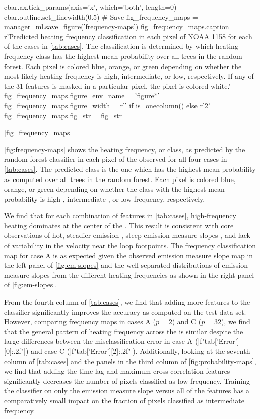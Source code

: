 \begin{pycode}[manager_ml]
cbar.ax.tick_params(axis='x', which='both', length=0)
cbar.outline.set_linewidth(0.5)
# Save
fig_frequency_maps = manager_ml.save_figure('frequency-maps')
fig_frequency_maps.caption = r'Predicted heating frequency classification in each pixel of NOAA 1158 for each of the cases in \autoref{tab:cases}. The classification is determined by which heating frequency class has the highest mean probability over all trees in the random forest. Each pixel is colored blue, orange, or green depending on whether the most likely heating frequency is high, intermediate, or low, respectively. If any of the 31 features is masked in a particular pixel, the pixel is colored white.'
fig_frequency_maps.figure_env_name = 'figure*'
fig_frequency_maps.figure_width = r'\columnwidth' if is_onecolumn() else r'2\columnwidth'
fig_frequency_maps.fig_str = fig_str
\end{pycode}
\py[manager_ml]|fig_frequency_maps|

\autoref{fig:frequency-maps} shows the heating frequency, or class, as predicted by the random forest classifier in each pixel of the observed \AR{} for all four cases in \autoref{tab:cases}.
The predicted class is the one which has the highest mean probability as computed over all trees in the random forest.
Each pixel is colored blue, orange, or green depending on whether the class with the highest mean probability is high-, intermediate-, or low-frequency, respectively.

We find that for each combination of features in \autoref{tab:cases}, high-frequency heating dominates at the center of the \AR{}.
This result is consistent with \AR{} core observations of hot, steadier emission \citep{warren_evidence_2010,warren_constraints_2011}, steep emission measure slopes \citep[e.g.][]{winebarger_using_2011,del_zanna_evolution_2015}, and lack of variability in the velocity \citep{brooks_flows_2009} near the loop footpoints.
The frequency classification map for case A is as expected given the observed emission measure slope map in the left panel of \autoref{fig:em-slopes} and the well-separated distributions of emission measure slopes from the different heating frequencies as shown in the right panel of \autoref{fig:em-slopes}.

From the fourth column of \autoref{tab:cases}, we find that adding more features to the classifier significantly improves the accuracy as computed on the test data set.
However, comparing frequency maps in cases A ($p=2$) and C ($p=32$), we find that the general pattern of heating frequency across the \AR{} is similar despite the large differences between the misclassification error in case A (\py[manager_ml]|f"{tab['Error'][0]:.2f}"|) and case C (\py[manager_ml]|f"{tab['Error'][2]:.2f}"|).
Additionally, looking at the seventh column of \autoref{tab:cases} and the panels in the third column of \autoref{fig:probability-maps}, we find that adding the time lag and maximum cross-correlation features significantly decreases the number of pixels classified as low frequency.
Training the classifier on only the emission measure slope versus all of the features has a comparatively small impact on the fraction of pixels classified as intermediate frequency.

